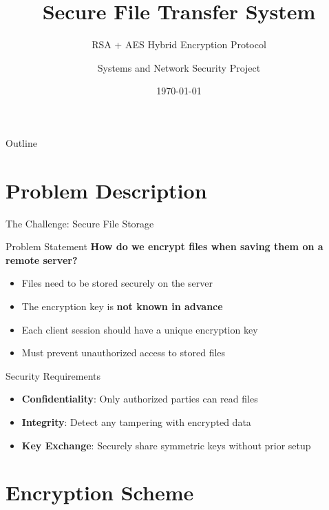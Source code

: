 \documentclass[aspectratio=169]{beamer}
\title{Secure File Transfer System}
\subtitle{RSA + AES Hybrid Encryption Protocol}
\author{Systems and Network Security Project}
\institute{University Project}
\date{\today}
\begin{document}
\begin{frame}
\titlepage
\end{frame}

\begin{frame}{Outline}
\tableofcontents
\end{frame}

\section{Problem Description}

\begin{frame}{The Challenge: Secure File Storage}
\begin{block}{Problem Statement}
\textbf{How do we encrypt files when saving them on a remote server?}
\begin{itemize}
    \item Files need to be stored securely on the server
    \item The encryption key is \textbf{not known in advance}
    \item Each client session should have a unique encryption key
    \item Must prevent unauthorized access to stored files
\end{itemize}
\end{block}

\vspace{0.5cm}

\begin{alertblock}{Security Requirements}
\begin{itemize}
    \item \textbf{Confidentiality}: Only authorized parties can read files
    \item \textbf{Integrity}: Detect any tampering with encrypted data
    \item \textbf{Key Exchange}: Securely share symmetric keys without prior setup
\end{itemize}
\end{alertblock}
\end{frame}

\section{Encryption Scheme}
\end{document}
